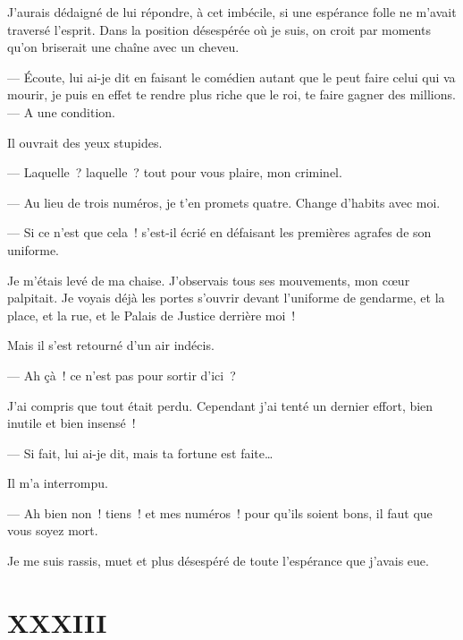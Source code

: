 \documentclass[french,twoside]{book} %
\begin{document}
 J’aurais dédaigné de lui répondre, à cet imbécile, si une espérance folle ne m’avait traversé l’esprit. Dans la position désespérée où je suis, on croit par moments qu’on briserait une chaîne avec un cheveu.\par
— Écoute, lui ai-je dit en faisant le comédien autant que le peut faire celui qui va mourir, je puis en effet te rendre plus riche que le roi, te faire gagner des millions. — A une condition.\par
Il ouvrait des yeux stupides.\par
— Laquelle ? laquelle ? tout pour vous plaire, mon criminel.\par
— Au lieu de trois numéros, je t’en promets quatre. Change d’habits avec moi.\par
— Si ce n’est que cela ! s’est-il écrié en défaisant les premières agrafes de son uniforme.\par
Je m’étais levé de ma chaise. J’observais tous ses mouvements, mon cœur palpitait. Je voyais déjà les portes s’ouvrir devant l’uniforme de gendarme, et la place, et la rue, et le Palais de Justice derrière moi !\par
Mais il s’est retourné d’un air indécis.\par
— Ah çà ! ce n’est pas pour sortir d’ici ?\par
J’ai compris que tout était perdu. Cependant j’ai tenté un dernier effort, bien inutile et bien insensé !\par
— Si fait, lui ai-je dit, mais ta fortune est faite…\par
Il m’a interrompu.\par
— Ah bien non ! tiens ! et mes numéros ! pour qu’ils soient bons, il faut que vous soyez mort.\par
Je me suis rassis, muet et plus désespéré de toute l’espérance que j’avais eue.
 \section[{XXXIII}]{XXXIII}
\label{ch33}\renewcommand{\leftmark}{XXXIII}
\end{document}

